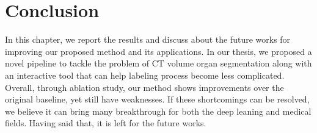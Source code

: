 \chapter{Conclusion}
\label{chap-conclusion}
\begin{ChapAbstract}

In this chapter, we report the results and discuss about the future works for improving our proposed method and its applications. In our thesis, we proposed a novel pipeline to tackle the problem of CT volume organ segmentation along with an interactive tool that can help labeling process become less complicated. Overall, through ablation study, our method shows improvements over the original baseline, yet still have weaknesses. If these shortcomings can be resolved, we believe it can bring many breakthrough for both the deep leaning and medical fields. Having said that, it is left for the future works. 

\end{ChapAbstract}


